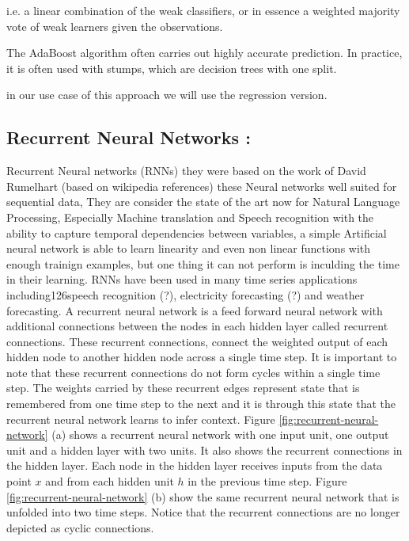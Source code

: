 i.e. a linear combination of the weak classifiers, or in essence a weighted majority vote of weak learners given the observations.

The AdaBoost algorithm often carries out highly accurate prediction.
In practice, it is often used with stumps, which are decision trees with one split.

in our use case of this approach we will use the regression version.


\subsection{Recurrent Neural Networks :}
Recurrent Neural networks (RNNs) they were based on the work of  David Rumelhart \cite{} (based on wikipedia references) these Neural networks  well suited for sequential  data, They are consider the state of the art now for Natural Language Processing, Especially Machine translation \citet{} and Speech recognition \citet{} with the ability to capture temporal dependencies between variables, a simple Artificial neural network is able to learn linearity and even non linear functions with enough trainign examples, but one thing it can not perform is inculding the time in their learning.  RNNs have been used in many time series applications including126speech recognition (?), electricity forecasting (?)  and weather forecasting.
A recurrent neural network is a feed forward neural network with additional connections between the nodes in each hidden layer called recurrent connections. These recurrent connections, connect the weighted output of each hidden node to another hidden node across a single time step. It is important to note that these recurrent connections do not form cycles within a single time step. The weights carried by these recurrent edges represent state that is remembered from one time step to the next and it is through this state that the recurrent neural network learns to infer context\cite{DBLP:journals/corr/Lipton15}.
Figure \ref{fig:recurrent-neural-network} (a) shows a recurrent neural network with one input unit, one output unit and a hidden layer with two units. It also shows the recurrent connections in the hidden layer. Each node in the hidden layer receives inputs from the data point $x$ and from each hidden unit $h$ in the previous time step. Figure \ref{fig:recurrent-neural-network} (b) show the same recurrent neural network that is unfolded into two time steps. Notice that the recurrent connections are no longer depicted as cyclic connections.

